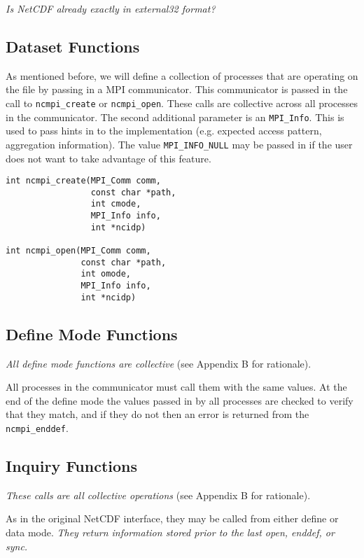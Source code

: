 \documentclass[10pt]{article}
\begin{document}
\emph{Is NetCDF already exactly in external32 format?}

\subsection{Dataset Functions}

As mentioned before, we will define a collection of processes that are
operating on the file by passing in a MPI communicator.  This communicator is
passed in the call to \texttt{ncmpi\_create} or \texttt{ncmpi\_open}.  These
calls are collective across all processes in the communicator.  The second
additional parameter is an \texttt{MPI\_Info}.  This is used to pass hints in
to the implementation (e.g. expected access pattern, aggregation
information).  The value \texttt{MPI\_INFO\_NULL} may be passed in if the user
does not want to take advantage of this feature.

\begin{verbatim}
int ncmpi_create(MPI_Comm comm, 
                 const char *path, 
                 int cmode,
                 MPI_Info info,
                 int *ncidp)

int ncmpi_open(MPI_Comm comm, 
               const char *path, 
               int omode,
               MPI_Info info,
               int *ncidp)
\end{verbatim}

\subsection{Define Mode Functions}

\emph{All define mode functions are collective} (see Appendix B for
rationale).

All processes in the communicator must call them with the same values.  At the
end of the define mode the values passed in by all processes are checked to
verify that they match, and if they do not then an error is returned from the
\texttt{ncmpi\_enddef}.


\subsection{Inquiry Functions}

\emph{These calls are all collective operations} (see Appendix B for
rationale).

As in the original NetCDF interface, they may be called from either define or
data mode.  \emph{ They return information stored prior to the last open,
enddef, or sync.}
\end{document}
